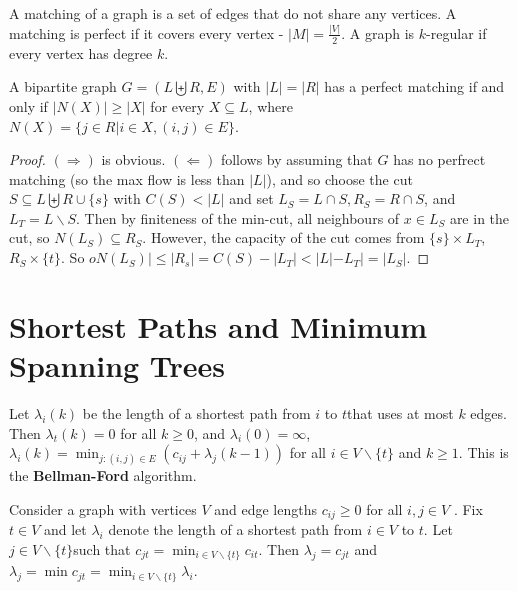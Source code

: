 \begin{defn}
  \label{sec:maxim-flows-perf-6}
  A matching of a graph is a set of edges that do not share any
  vertices.  A matching is perfect if it covers every vertex - $|M| =
  \frac{|V|}{2}$.  A graph is $k$-regular if every vertex has degree $k$.
\end{defn}

\begin{thm}
  \label{sec:maxim-flows-perf-7}
  A bipartite graph $G = (L \biguplus R, E)$ with $|L| = |R|$ has a
  perfect matching if and only if $|N(X)| \geq |X|$ for every $X
  \subseteq L$, where $N(X) = \{ j \in R | i \in X, (i, j) \in E \}$.
\end{thm}

\begin{proof}
  $(\Rightarrow)$ is obvious. $(\Leftarrow)$ follows by assuming that
  $G$ has no perfrect matching (so the max flow is less than $|L|$),
  and so choose the cut $S \subseteq L \biguplus R \cup \{ s \}$ with
  $C(S) < |L|$ and set $L_{S} = L \cap S, R_{S} = R \cap S$, and
  $L_{T} = L \backslash S$.  Then by finiteness of the min-cut, all
  neighbours of $x \in L_{S}$ are in the cut, so $N(L_{S}) \subseteq
  R_{S}$.  However, the capacity of the cut comes from $\{ s \}
  \times L_{T}$, $R_{S} \times \{ t \} $.  So $oN(L_{S})| \leq |R_{s}|
  = C(S) - |L_{T}| < |L| - L_{T}| = |L_{S}|$.
\end{proof}

\section{Shortest Paths and Minimum Spanning Trees}
\label{sec:short-paths-minim}

\begin{thm}
  \label{sec:short-paths-minim-1}
  Let $\lambda_{i}(k)$ be the length of a shortest path from $i$ to
  $t$that uses at most $k$ edges.  Then $\lambda_{t}(k) = 0$ for all
  $k \geq 0$, and $\lambda_{i}(0) = \infty$, $\lambda_{i}(k) =
  \min_{j: (i, j) \in E}(c_{ij} + \lambda_{j}(k-1))$ for all $i \in V
  \backslash \{ t \}$ and $k \geq 1$.  This is the
  \textbf{Bellman-Ford} algorithm.
\end{thm}

\begin{thm}
  \label{sec:short-paths-minim-2}
  Consider a graph with vertices $V$ and edge lengths $c_{ij} \geq 0$
  for all $i, j \in V$ . Fix $t \in V$ and let $\lambda_{i}$ denote
  the length of a shortest path from $i \in V$ to $t$.  Let $j \in V
  \backslash \{ t \} $such that $c_{jt} = \min_{i \in V \backslash \{
    t \}} c_{it}$. Then $\lambda_{j} = c_{jt}$ and $\lambda_{j} = \min
  c_{jt} = \min_{i \in V \backslash \{ t \}} \lambda_{i}$.
\end{thm}

